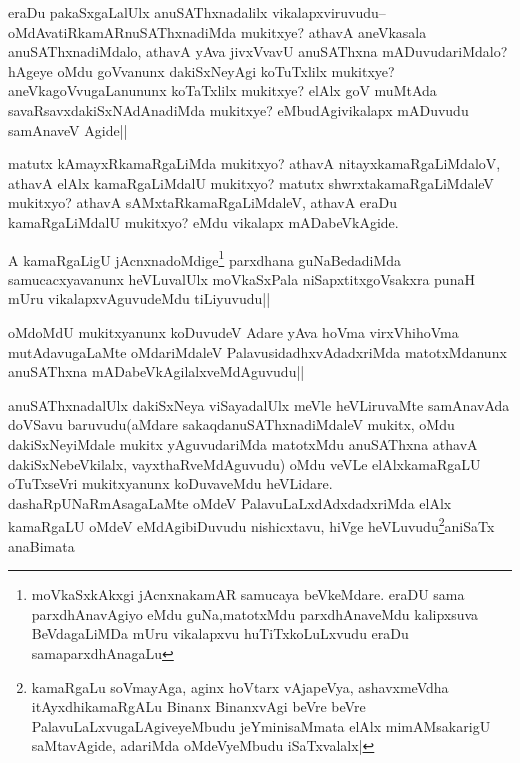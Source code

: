 \begin{artha}
eraDu pakaSxgaLalUlx anuSAThxnadalilx vikalapxviruvudu-- oMdAvatiRkamARnuSAThxnadiMda mukitxye? athavA aneVkasala anuSAThxnadiMdalo, athavA yAva jivxVvavU anuSAThxna mADuvudariMdalo? hAgeye oMdu goVvanunx dakiSxNeyAgi koTuTxlilx mukitxye? aneVkagoVvugaLanununx  koTaTxlilx mukitxye? elAlx goV muMtAda savaRsavxdakiSxNAdAnadiMda mukitxye? eMbudAgivikalapx mADuvudu samAnaveV Agide||
\end{artha}

\begin{artha}
matutx kAmayxRkamaRgaLiMda mukitxyo? athavA nitayxkamaRgaLiMdaloV, athavA elAlx kamaRgaLiMdalU mukitxyo? matutx shwrxtakamaRgaLiMdaleV mukitxyo? athavA sAMxtaRkamaRgaLiMdaleV, athavA eraDu kamaRgaLiMdalU mukitxyo? eMdu vikalapx mADabeVkAgide. 
\end{artha}

\begin{artha}
A kamaRgaLigU jAcnxnadoMdige\footnote{moVkaSxkAkxgi jAcnxnakamAR samucaya beVkeMdare. eraDU sama parxdhAnavAgiyo eMdu guNa,matotxMdu parxdhAnaveMdu kalipxsuva BeVdagaLiMDa mUru vikalapxvu huTiTxkoLuLxvudu eraDu samaparxdhAnagaLu} parxdhana guNaBedadiMda samucacxyavanunx heVLuvalUlx moVkaSxPala niSapxtitxgoVsakxra punaH mUru vikalapxvAguvudeMdu tiLiyuvudu||
\end{artha}


\begin{artha}
oMdoMdU mukitxyanunx koDuvudeV Adare yAva hoVma virxVhihoVma mutAdavugaLaMte oMdariMdaleV PalavusidadhxvAdadxriMda matotxMdanunx anuSAThxna mADabeVkAgilalxveMdAguvudu||
\end{artha}

\begin{artha}
anuSAThxnadalUlx dakiSxNeya viSayadalUlx meVle heVLiruvaMte samAnavAda doVSavu baruvudu(aMdare sakaqdanuSAThxnadiMdaleV mukitx, oMdu dakiSxNeyiMdale mukitx yAguvudariMda matotxMdu anuSAThxna athavA dakiSxNebeVkilalx, vayxthaRveMdAguvudu) oMdu veVLe elAlxkamaRgaLU oTuTxseVri mukitxyanunx koDuvaveMdu heVLidare. dashaRpUNaRmAsagaLaMte oMdeV PalavuLaLxdAdxdadxriMda elAlx kamaRgaLU oMdeV eMdAgibiDuvudu nishicxtavu, hiVge heVLuvudu\footnote{kamaRgaLu soVmayAga, aginx hoVtarx vAjapeVya, ashavxmeVdha itAyxdhikamaRgALu Binanx BinanxvAgi beVre beVre PalavuLaLxvugaLAgiveyeMbudu jeYminisaMmata elAlx mimAMsakarigU saMtavAgide, adariMda oMdeVyeMbudu iSaTxvalalx|}aniSaTx anaBimata   
\end{artha}

